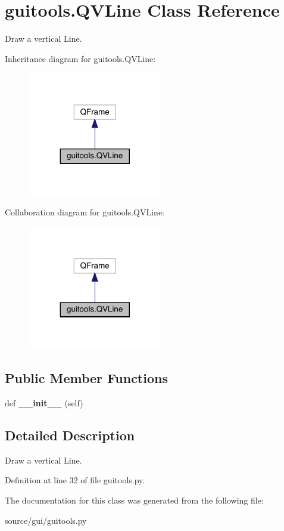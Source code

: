 \hypertarget{classguitools_1_1_q_v_line}{}\section{guitools.\+Q\+V\+Line Class Reference}
\label{classguitools_1_1_q_v_line}


Draw a vertical Line.  




Inheritance diagram for guitools.\+Q\+V\+Line\+:\nopagebreak
\begin{figure}[H]
\begin{center}
\leavevmode
\includegraphics[width=167pt]{classguitools_1_1_q_v_line__inherit__graph}
\end{center}
\end{figure}


Collaboration diagram for guitools.\+Q\+V\+Line\+:\nopagebreak
\begin{figure}[H]
\begin{center}
\leavevmode
\includegraphics[width=167pt]{classguitools_1_1_q_v_line__coll__graph}
\end{center}
\end{figure}
\subsection*{Public Member Functions}
\begin{DoxyCompactItemize}
\item 
\mbox{\label{classguitools_1_1_q_v_line_a332b7516735bc7d835c8f345e174d2bd}} 
def {\bfseries \+\_\+\+\_\+init\+\_\+\+\_\+} (self)
\end{DoxyCompactItemize}


\subsection{Detailed Description}
Draw a vertical Line. 

Definition at line 32 of file guitools.\+py.



The documentation for this class was generated from the following file\+:\begin{DoxyCompactItemize}
\item 
source/gui/guitools.\+py\end{DoxyCompactItemize}
